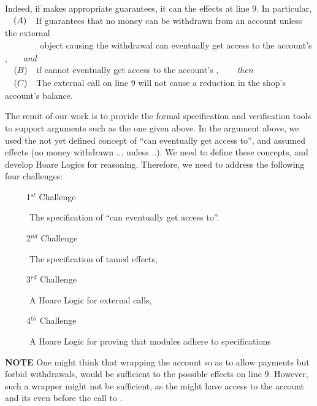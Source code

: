\vspace{.1cm}
Indeed, if \Mshop  makes appropriate guarantees, it can \tame  the effects at line 9. In particular,  
 \\
$\strut \ \ \ (A)\ \ $ If \Mshop guarantees that no money can be withdrawn from an account unless the external\\  
$\strut \ \ \ \ \ \ \ \ \ \ \ $ object causing the withdrawal can eventually get access to the account's \password, \ \ \  {\emph{and}} \\
$\strut \ \ \ (B)\ \ $  if  cannot eventually get access to the account's \password,   \ \ \    {\emph{ then}}  \\
$\strut \ \ \ (C)\ \ $ The external  call on line 9 will not cause a reduction in the shop's account's balance.


\vspace{.3cm}
{The remit of our work is to provide the formal specification and verification tools to support arguments such as the one given above. 
In the argument above, we used the not yet defined concept of  ``can  eventually get access to'', and assumed \tamed effects (no money withdrawn ... unless ..). 
We need to define these concepts, and develop Hoare Logics for reasoning.
Therefore, we need to address the following four challenges:}
\begin{description}
\item[\ \ \ \ \  1$^{st}$ Challenge] The specification   of ``can eventually get access to''. 

\item[\ \ \ \ \   2$^{nd}$ Challenge] The specification of tamed effects, 

\item[\ \ \ \ \  3$^{rd}$ Challenge] A  Hoare Logic for external calls,

\item [\ \ \ \ \   4$^{th}$ Challenge]  A Hoare Logic for proving that modules adhere to specifications
\end{description}

\vspace{.2cm}
\noindent
 \textbf{NOTE} {One might think that  wrapping the account so as to allow payments but forbid withdrawals, would be sufficient  to \tame the possible effects on line 9. 
However, such a wrapper might not be sufficient, as the
  might  have access to the account and its \password even before the call to . 
}

